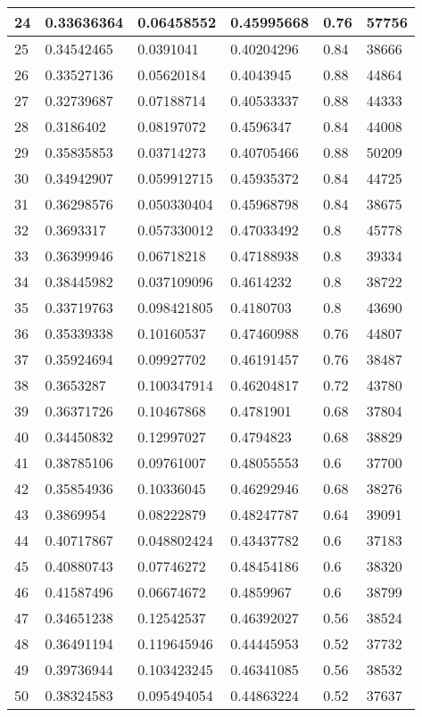 \begin{longtable}{|l|l|l|l|l|l|}
24 & 0.33636364 & 0.06458552 & 0.45995668 & 0.76 & 57756 \\ \hline 
25 & 0.34542465 & 0.0391041 & 0.40204296 & 0.84 & 38666 \\ \hline 
26 & 0.33527136 & 0.05620184 & 0.4043945 & 0.88 & 44864 \\ \hline 
27 & 0.32739687 & 0.07188714 & 0.40533337 & 0.88 & 44333 \\ \hline 
28 & 0.3186402 & 0.08197072 & 0.4596347 & 0.84 & 44008 \\ \hline 
29 & 0.35835853 & 0.03714273 & 0.40705466 & 0.88 & 50209 \\ \hline 
30 & 0.34942907 & 0.059912715 & 0.45935372 & 0.84 & 44725 \\ \hline 
31 & 0.36298576 & 0.050330404 & 0.45968798 & 0.84 & 38675 \\ \hline 
32 & 0.3693317 & 0.057330012 & 0.47033492 & 0.8 & 45778 \\ \hline 
33 & 0.36399946 & 0.06718218 & 0.47188938 & 0.8 & 39334 \\ \hline 
34 & 0.38445982 & 0.037109096 & 0.4614232 & 0.8 & 38722 \\ \hline 
35 & 0.33719763 & 0.098421805 & 0.4180703 & 0.8 & 43690 \\ \hline 
36 & 0.35339338 & 0.10160537 & 0.47460988 & 0.76 & 44807 \\ \hline 
37 & 0.35924694 & 0.09927702 & 0.46191457 & 0.76 & 38487 \\ \hline 
38 & 0.3653287 & 0.100347914 & 0.46204817 & 0.72 & 43780 \\ \hline 
39 & 0.36371726 & 0.10467868 & 0.4781901 & 0.68 & 37804 \\ \hline 
40 & 0.34450832 & 0.12997027 & 0.4794823 & 0.68 & 38829 \\ \hline 
41 & 0.38785106 & 0.09761007 & 0.48055553 & 0.6 & 37700 \\ \hline 
42 & 0.35854936 & 0.10336045 & 0.46292946 & 0.68 & 38276 \\ \hline 
43 & 0.3869954 & 0.08222879 & 0.48247787 & 0.64 & 39091 \\ \hline 
44 & 0.40717867 & 0.048802424 & 0.43437782 & 0.6 & 37183 \\ \hline 
45 & 0.40880743 & 0.07746272 & 0.48454186 & 0.6 & 38320 \\ \hline 
46 & 0.41587496 & 0.06674672 & 0.4859967 & 0.6 & 38799 \\ \hline 
47 & 0.34651238 & 0.12542537 & 0.46392027 & 0.56 & 38524 \\ \hline 
48 & 0.36491194 & 0.119645946 & 0.44445953 & 0.52 & 37732 \\ \hline 
49 & 0.39736944 & 0.103423245 & 0.46341085 & 0.56 & 38532 \\ \hline 
50 & 0.38324583 & 0.095494054 & 0.44863224 & 0.52 & 37637 \\ \hline 
\end{longtable}